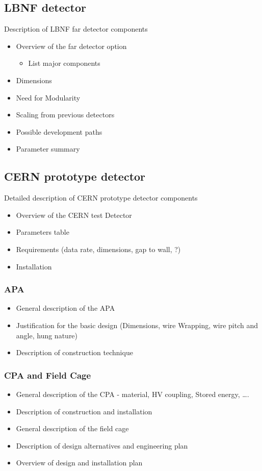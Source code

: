 \subsection{LBNF detector}
Description of LBNF far detector components
\begin{itemize}
\item Overview of the far detector option
\begin{itemize}
\item List major components
\end{itemize}
\item Dimensions
\item Need for Modularity
\item Scaling from previous detectors
\item Possible development paths
\item Parameter summary
\end{itemize}


\subsection{CERN prototype detector}
Detailed description of CERN prototype detector components
\begin{itemize}
\item Overview of the CERN test Detector
\item Parameters table
\item Requirements (data rate, dimensions, gap to wall,  ?)
\item Installation
\end{itemize}

\subsubsection{APA}
\begin{itemize}
\item General description of the APA
\item Justification for the basic design (Dimensions, wire Wrapping, wire pitch and angle, hung nature)
\item Description of construction technique
\end{itemize}

\subsubsection{CPA and Field Cage}
\begin{itemize}
\item General description of the CPA - material, HV coupling, Stored energy, ….
\item Description of construction and installation
\item General description of the field cage
\item Description of design alternatives and engineering plan
\item Overview of design and installation plan
\end{itemize}

